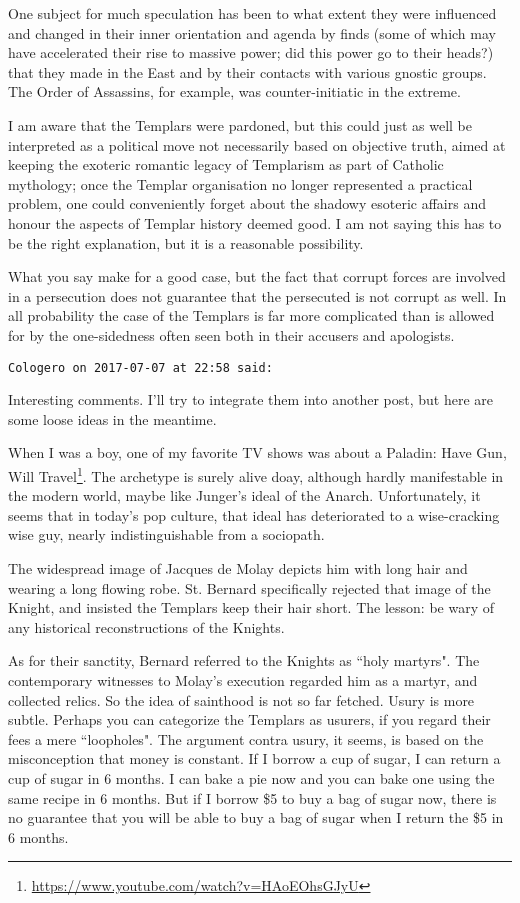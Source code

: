 \begin{footnotesize}
\begin{sffamily}
One subject for much speculation has been to what extent they were influenced and changed in their inner orientation and agenda by finds (some of which may have accelerated their rise to massive power; did this power go to their heads?) that they made in the East and by their contacts with various gnostic groups. The Order of Assassins, for example, was counter-initiatic in the extreme.

I am aware that the Templars were pardoned, but this could just as well be interpreted as a political move not necessarily based on objective truth, aimed at keeping the exoteric romantic legacy of Templarism as part of Catholic mythology; once the Templar organisation no longer represented a practical problem, one could conveniently forget about the shadowy esoteric affairs and honour the aspects of Templar history deemed good. I am not saying this has to be the right explanation, but it is a reasonable possibility. 

What you say make for a good case, but the fact that corrupt forces are involved in a persecution does not guarantee that the persecuted is not corrupt as well. In all probability the case of the Templars is far more complicated than is allowed for by the one-sidedness often seen both in their accusers and apologists.


\hfill

\texttt{Cologero on 2017-07-07 at 22:58 said: }

Interesting comments. I'll try to integrate them into another post, but here are some loose ideas in the meantime.

When I was a boy, one of my favorite TV shows was about a Paladin: Have Gun, Will Travel\footnote{\url{https://www.youtube.com/watch?v=HAoEOhsGJyU}}. The archetype is surely alive doay, although hardly manifestable in the modern world, maybe like Junger's ideal of the Anarch. Unfortunately, it seems that in today's pop culture, that ideal has deteriorated to a wise-cracking wise guy, nearly indistinguishable from a sociopath.

The widespread image of Jacques de Molay depicts him with long hair and wearing a long flowing robe. St. Bernard specifically rejected that image of the Knight, and insisted the Templars keep their hair short. The lesson: be wary of any historical reconstructions of the Knights.

As for their sanctity, Bernard referred to the Knights as ``holy martyrs". The contemporary witnesses to Molay's execution regarded him as a martyr, and collected relics. So the idea of sainthood is not so far fetched. Usury is more subtle. Perhaps you can categorize the Templars as usurers, if you regard their fees a mere ``loopholes". The argument contra usury, it seems, is based on the misconception that money is constant. If I borrow a cup of sugar, I can return a cup of sugar in 6 months. I can bake a pie now and you can bake one using the same recipe in 6 months. But if I borrow \$5 to buy a bag of sugar now, there is no guarantee that you will be able to buy a bag of sugar when I return the \$5 in 6 months.


\end{sffamily}
\end{footnotesize}
